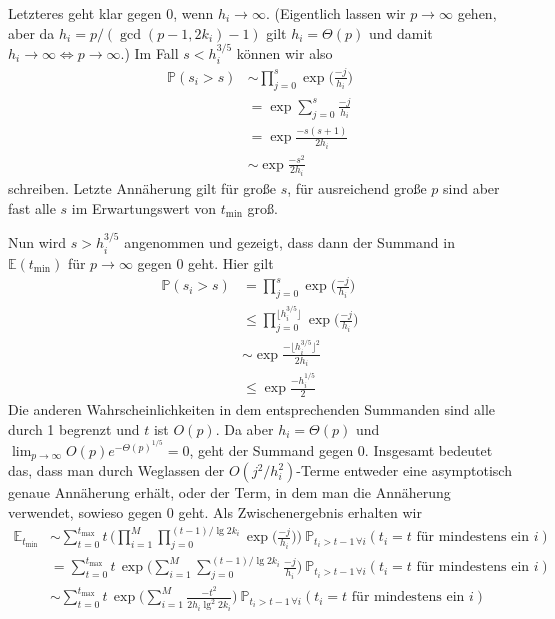 \documentclass[a4paper, 10pt, ngerman]{article}
\newcommand{\E}{\mathbb{E}}
\renewcommand{\P}{\mathbb{P}}
\begin{document}
Letzteres geht klar gegen 0, wenn $h_i \to \infty$. (Eigentlich lassen wir $p \to \infty$ gehen, aber da $h_i = p/(\gcd(p - 1, 2k_i) - 1)$ gilt $h_i = \Theta(p)$ und damit $h_i \to \infty \Longleftrightarrow p \to \infty$.) Im Fall $s < h_i^{3/5}$ können wir also
\begin{align*}
    \P(s_i > s)
     & \sim \prod_{j = 0}^{s} \exp \bigg ( \frac {-j}{h_i} \bigg ) \\
     & =\exp \sum_{j = 0}^{s} \frac {-j} {h_i}                     \\
     & = \exp \frac {-s (s + 1)} {2h_i}                            \\
     & \sim \exp \frac {-s^2} {2h_i}
\end{align*}
schreiben. Letzte Annäherung gilt für große $s$, für ausreichend große $p$ sind aber fast alle $s$ im Erwartungswert von $t_{\min}$ groß.

Nun wird $s > h_i^{3/5}$ angenommen und gezeigt, dass dann der Summand in $\E(t_{\min})$ für $p \to \infty$ gegen 0 geht. Hier gilt
\begin{align*}
    \P(s_i > s)
     & = \prod_{j = 0}^{s} \exp \bigg ( \frac {-j}{h_i} \bigg )          \\
     & \le \prod_{j = 0}^{\big \lfloor h_i^{3/5} \big \rfloor}
    \exp \bigg ( \frac {-j}{h_i} \bigg )                                 \\
     & \sim \exp \frac {- \big \lfloor h_i^{3/5} \big \rfloor^2 } {2h_i} \\
     & \le \exp \frac {- h_i^{1/5}} {2}
\end{align*}
Die anderen Wahrscheinlichkeiten in dem entsprechenden Summanden sind alle durch 1 begrenzt und $t$ ist $O(p)$. Da aber $h_i = \Theta(p)$ und $\lim_{p \to \infty} O(p) e^{-\Theta(p)^{1/5}} = 0$, geht der Summand gegen 0. Insgesamt bedeutet das, dass man durch Weglassen der $O(j^2/h_i^2)$-Terme entweder eine asymptotisch genaue Annäherung erhält, oder der Term, in dem man die Annäherung verwendet, sowieso gegen 0 geht. Als Zwischenergebnis erhalten wir
\begin{align}
    \E_{t_{\min}}
     & \sim \sum_{t = 0}^{t_{\max}} t \,
    \Bigg ( \prod_{i = 1}^M \prod_{j = 0}^{(t-1) / \lg 2k_i}
    \exp \bigg ( \frac {-j}{h_i} \bigg ) \Bigg ) \
    \P_{t_i > t - 1 \, \forall i}(t_i = t \text{ für mindestens ein } i)
    \nonumber                            \\
     & = \sum_{t = 0}^{t_{\max}} t \,
    \exp \Bigg ( \sum_{i = 1}^M \sum_{j = 0}^{(t-1) / \lg 2k_i}
    \frac {-j}{h_i} \Bigg ) \
    \P_{t_i > t - 1 \, \forall i}(t_i = t \text{ für mindestens ein } i)
    \nonumber                            \\
     & \sim \sum_{t = 0}^{t_{\max}} t \,
    \exp \Bigg ( \sum_{i = 1}^M \frac {-t^2} {2 h_i \lg^2 2k_i} \Bigg ) \
    \P_{t_i > t - 1 \, \forall i}(t_i = t \text{ für mindestens ein } i)
    \label{expectation-tmin-intermed}
\end{align}
\end{document}
